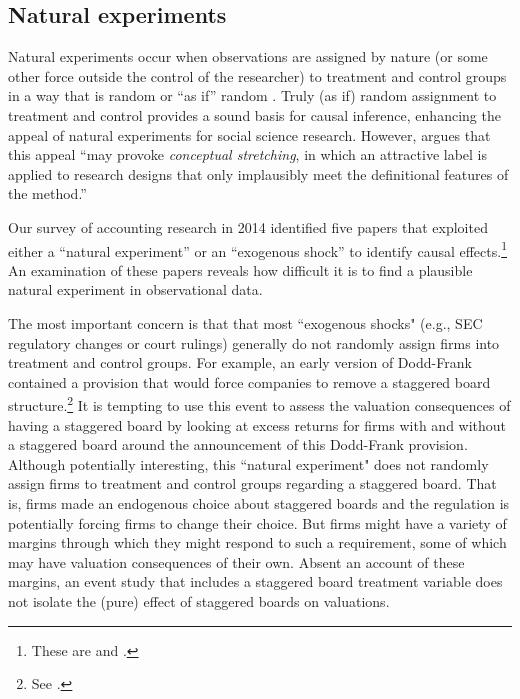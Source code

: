 \documentclass[12pt,reqno,titlepage]{amsart}
\begin{document}
\begin{doublespace}
\subsection{Natural experiments}
Natural experiments occur when observations are assigned by nature (or some other force outside the control of the researcher) to treatment and control groups in a way that is random or ``as if'' random \citep{Dunning:2012tt}. 
Truly (as if) random assignment to treatment and control provides a sound basis for causal inference, enhancing the appeal of natural experiments for social science research.
However, \citet[\,p.3, emphasis added]{Dunning:2012tt} argues that this appeal ``may provoke \emph{conceptual stretching}, in which an attractive label is applied to research designs that only implausibly meet the definitional features of the method.'' 

Our survey of accounting research in 2014 identified five papers that exploited either a ``natural experiment'' or an ``exogenous shock'' to identify causal effects.\footnote{These are \citet{Lo:2013jk,Aier:2014ii,Kirk:2014gx,Houston:2014hv} and \citet{Hail:2014fq}.}
An examination of these papers reveals how difficult it is to find a plausible natural experiment in observational data.

The most important concern is that that most ``exogenous shocks" (e.g., SEC regulatory changes or court rulings) generally do not randomly assign firms into treatment and control groups.
For example, an early version of Dodd-Frank contained a provision that would force companies to remove a staggered board structure.\footnote{See \citet{Larcker:2011hs}.}
It is tempting to use this event to assess the valuation consequences of having a staggered board by looking at excess returns for firms with and without a staggered board around the announcement of this Dodd-Frank provision.
Although potentially interesting, this ``natural experiment" does not randomly assign firms to treatment and control groups regarding a staggered board.  That is, firms made an endogenous choice about staggered boards and the regulation is potentially forcing firms to change their choice. But firms might have a variety of margins through which they might respond to such a requirement, some of which may have valuation consequences of their own. Absent an account of these margins, an event study that includes a staggered board treatment variable does not isolate the (pure) effect of staggered boards on valuations. 


\end{doublespace}
\end{document}
